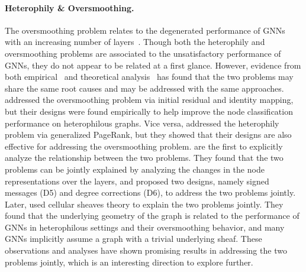 \paragraph{Heterophily \& Oversmoothing.}
The oversmoothing problem relates to the degenerated performance of GNNs with an increasing number of layers~\cite{li2018deeper}. 
Though both the heterophily and oversmoothing problems are associated to the unsatisfactory performance of GNNs, they do not appear to be related at a first glance. However, evidence from both empirical~\cite{chen2020simple, chien2021adaptive} and theoretical analysis~\cite{yan2022two, bodnar2022neural} has found that the two problems may share the same root causes and may be addressed with the same approaches.
\citet{chen2020simple} addressed the oversmoothing problem via initial residual and identity mapping, but their designs were found empirically to help improve the node classification performance on heterophilous graphs. 
Vice versa, \citet{chien2021adaptive} addressed the heterophily problem via generalized PageRank, but they showed that their designs are also effective for addressing the oversmoothing problem. 
\citet{yan2022two} are the first to explicitly analyze the relationship between the two problems. They found that the two problems can be jointly explained by analyzing the changes in the node representations over the layers, and proposed two designs, namely signed messages (D5) and degree corrections (D6), to address the two problems jointly.
Later, \citet{bodnar2022neural} used cellular sheaves theory to explain the two problems jointly. They found that the underlying geometry of the graph is related to the performance of GNNs in heterophilous settings and their oversmoothing behavior, and many GNNs implicitly assume a graph with a trivial underlying sheaf. These observations and analyses have shown promising results in addressing the two problems jointly, which is an interesting direction to explore further.